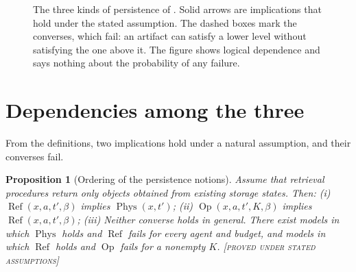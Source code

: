 \documentclass[11pt,twoside,openright]{book}
\theoremstyle{plain}
\newtheorem{proposition}[theorem]{Proposition}
\theoremstyle{definition}
\theoremstyle{remark}
\newcommand{\Proved}{\textup{\textsc{[proved under stated assumptions]}}}
\newcommand{\Phys}{\operatorname{Phys}}
\newcommand{\Refp}{\operatorname{Ref}}
\newcommand{\Oper}{\operatorname{Op}}
\begin{document}
\begin{figure}[t]
\centering
{}
\caption{The three kinds of persistence of . Solid arrows are implications that hold under the stated assumption. The dashed boxes mark the converses, which fail: an artifact can satisfy a lower level without satisfying the one above it. The figure shows logical dependence and says nothing about the probability of any failure.}
\label{fig:persistence}
\end{figure}

\section{Dependencies among the three}

From the definitions, two implications hold under a natural assumption, and their converses fail.

\begin{proposition}[Ordering of the persistence notions]\label{prop:independence}
Assume that retrieval procedures return only objects obtained from existing storage states. Then:
(i) $\Refp(x,a,t',\beta)$ implies $\Phys(x,t')$; (ii) $\Oper(x,a,t',K,\beta)$ implies $\Refp(x,a,t',\beta)$; (iii) Neither converse holds in general. There exist models in which $\Phys$ holds and $\Refp$ fails for every agent and budget, and models in which $\Refp$ holds and $\Oper$ fails for a nonempty $K$.
\Proved{}
\end{proposition}
\end{document}
